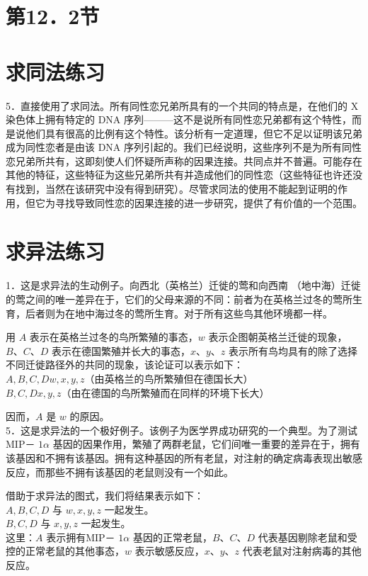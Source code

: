 \section*{第12．2节}
\section*{求同法练习}
5．直接使用了求同法。所有同性恋兄弟所具有的一个共同的特点是，在他们的 X 染色体上拥有特定的 DNA 序列———这不是说所有同性恋兄弟都有这个特性，而是说他们具有很高的比例有这个特性。该分析有一定道理，但它不足以证明该兄弟成为同性恋者是由该 DNA 序列引起的。我们已经说明，这些序列不是为所有同性恋兄弟所共有，这即刻使人们怀疑所声称的因果连接。共同点并不普遍。可能存在其他的特征，这些特征为这些兄弟所共有并造成他们的同性恋（这些特征也许还没有找到，当然在该研究中没有得到研究）。尽管求同法的使用不能起到证明的作用，但它为寻找导致同性恋的因果连接的进一步研究，提供了有价值的一个范围。

\section*{求异法练习}
1．这是求异法的生动例子。向西北（英格兰）迁徙的莺和向西南 （地中海）迁徙的莺之间的唯一差异在于，它们的父母来源的不同：前者为在英格兰过冬的莺所生育，后者则为在地中海过冬的莺所生育。对于所有这些鸟其他环境都一样。

用 $A$ 表示在英格兰过冬的鸟所繁殖的事态，$w$ 表示企图朝英格兰迁徙的现象，$B 、 C 、 D$ 表示在德国繁殖并长大的事态，$x 、 y 、 z$ 表示所有鸟均具有的除了选择不同迁徙路径外的共同的现象，该论证可以表示如下：\\
$A, B, C, D w, x, y, z$（由英格兰的鸟所繁殖但在德国长大）\\
$B, C, D x, y, z$（由在德国的鸟所繁殖而在同样的环境下长大）

因而，$A$ 是 $w$ 的原因。\\
5．这是求异法的一个极好例子。该例子为医学界成功研究的一个典型。为了测试 MIP－ $1 \alpha$ 基因的因果作用，繁殖了两群老鼠，它们间唯一重要的差异在于，拥有该基因和不拥有该基因。拥有这种基因的所有老鼠，对注射的确定病毒表现出敏感反应，而那些不拥有该基因的老鼠则没有一个如此。

借助于求异法的图式，我们将结果表示如下：\\
$A, B, C, D$ 与 $w, x, y, z$ 一起发生。\\
$B, C, D$ 与 $x, y, z$ 一起发生。\\
这里：$A$ 表示拥有MIP－ $1 \alpha$ 基因的正常老鼠，$B 、 C 、 D$ 代表基因剔除老鼠和受控的正常老鼠的其他事态，$w$ 表示敏感反应，$x 、 y 、 z$ 代表老鼠对注射病毒的其他反应。

